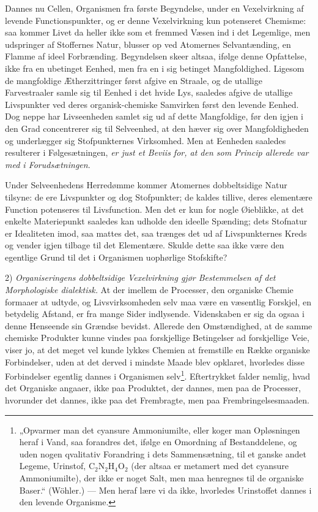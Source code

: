 \documentclass[12pt,a4paper]{book}
\begin{document}
Dannes nu Cellen, Organismen fra første Begyndelse, under en
Vexelvirkning af levende Functionspunkter, og er denne
Vexelvirkning kun potenseret Chemisme: saa kommer Livet da heller
ikke som et fremmed Væsen ind i det Legemlige, men udspringer af
Stoffernes Natur, blusser op ved Atomernes Selvantænding, en Flamme
af ideel Forbrænding. Begyndelsen skeer altsaa, ifølge denne
Opfattelse, ikke fra en ubetinget Eenhed, men fra en i sig betinget
Mangfoldighed. Ligesom de mangfoldige Ætherzittringer først afgive
en Straale, og de utallige Farvestraaler samle sig til Eenhed i det
hvide Lys, saaledes afgive de utallige Livspunkter ved deres
organisk-chemiske Samvirken først den levende Eenhed. Dog neppe har
Livseenheden samlet sig ud af dette Mangfoldige, før den igjen i
den Grad concentrerer sig til Selveenhed, at den hæver sig over
Mangfoldigheden og underlægger sig Stofpunkternes Virksomhed. Men
at Eenheden saaledes resulterer i Følgesætningen, \emph{er just et
Beviis for, at den som Princip allerede var med i Forudsætningen}.

Under Selveenhedens Herredømme kommer Atomernes dobbeltsidige
Natur tilsyne: de ere Livspunkter og dog Stofpunkter; de kaldes
tillive, deres elementære Function potenseres til Livsfunction.
Men det er kun for nogle Øieblikke, at det enkelte Materiepunkt
saaledes kan udholde den ideelle Spænding; dets Stofnatur er
Idealiteten imod, saa mattes det, saa trænges det ud af
Livspunkternes Kreds og vender igjen tilbage til det Elementære.
Skulde dette saa ikke være den egentlige Grund til det i Organismen
uophørlige Stofskifte?

2) \emph{Organiseringens dobbeltsidige Vexelvirkning gjør
Bestemmelsen af det Morphologiske dialektisk.} At der imellem de
Processer, den organiske Chemie
\setcounter{footnote}{0}
formaaer at udtyde, og Livsvirksomheden selv maa være en væsentlig
Forskjel, en betydelig Afstand, er fra mange Sider indlysende.
Videnskaben er sig da ogsaa i denne Henseende sin Grændse bevidst.
Allerede den Omstændighed, at de samme chemiske Produkter kunne
vindes paa forskjellige Betingelser ad forskjellige Veie, viser jo,
at det meget vel kunde lykkes Chemien at fremstille en Række
organiske Forbindelser, uden at det derved i mindste Maade blev
opklaret, hvorledes disse Forbindelser egentlig dannes i
Organismen selv\footnote{„Opvarmer man det cyansure Ammoniumilte,
eller koger man Opløsningen heraf i Vand, saa forandres det,
ifølge en Omordning af Bestanddelene, og uden nogen qvalitativ
Forandring i dets Sammensætning, til et ganske andet Legeme,
Urinstof, $\mathrm{C}_2\mathrm{N}_2\mathrm{H}_4\mathrm{O}_2$ (der
altsaa er metamert med det cyansure Ammoniumilte), der ikke er
noget Salt, men maa henregnes til de organiske Baser.“ (Wöhler.)
--- Men heraf lære vi da ikke, hvorledes Urinstoffet dannes i den
levende Organisme.}.
Eftertrykket falder nemlig, hvad det Organiske angaaer, ikke paa
Produktet, der dannes, men paa de Processer, hvorunder det dannes,
ikke paa det Frembragte, men paa Frembringelsesmaaden.
\end{document}
